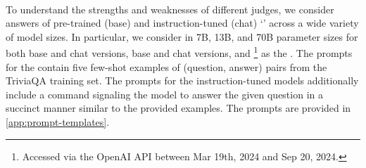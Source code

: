 \paragraph{\Evaluatormodels} \label{subsec:evaluators}
%
To understand the strengths and weaknesses of different judges, we consider answers of pre-trained (base) and instruction-tuned (chat) `\evaluatormodels' across a wide variety of model sizes. %
In particular, we consider  \citep{touvron2023llama} in 7B, 13B, and 70B parameter sizes for both base and chat versions,  \citep{jiang2023mistral} base and chat versions, and \eval{\gpt}\footnote{Accessed via the OpenAI API between Mar 19th, 2024 and Sep 20, 2024.} \citep{achiam2023gpt} as the \evaluatormodels. 
%
The prompts for the \evaluatormodels contain five few-shot examples of (question, answer) pairs from the TriviaQA training set.
The prompts for the instruction-tuned models additionally include a command signaling the model to answer the given question in a succinct manner similar to the provided examples.
The prompts are provided in \cref{app:prompt-templates}.


